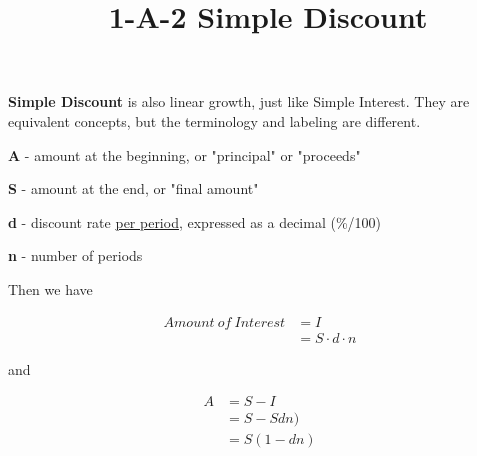\documentclass[12pt]{article}
\title{\normalfont\ 1-A-2 Simple Discount} %
\author{}  %
\date{}  %
\begin{document}
\maketitle %

\vspace{-1in}

\begin{flushleft}
    \textbf{Simple Discount} is also linear growth, just like Simple Interest.
    They are equivalent concepts, but the terminology and labeling are different.
\end{flushleft}

\begin{description}
    \item\textbf{A} - amount at the beginning, or "principal" or "proceeds"
    \item\textbf{S} - amount at the end, or "final amount"
    \item\textbf{d} - discount rate \underline{per period}, expressed as a decimal {(\%/100)}
    \item\textbf{n} - number of periods
\end{description}

\begin{flushleft}
    Then we have
\end{flushleft}

\vspace{-.25in}

\begin{align*}
    Amount \: of \: Interest & = I                 \\
                             & = S \cdot d \cdot n
\end{align*}

\begin{flushleft}
    and
\end{flushleft}

\vspace{-.25in}

\begin{align*}
    A & = S - I     \\
      & = S - Sdn)  \\
      & = S(1 - dn)
\end{align*}

\vspace{.25in}
\end{document}
